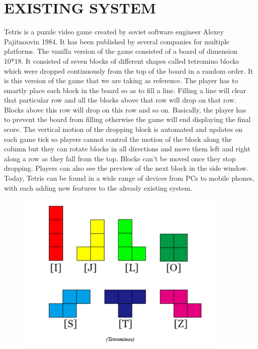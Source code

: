 \newpage
\section{EXISTING SYSTEM}
Tetris is a puzzle video game created by soviet software engineer Alexey Pajitnoovin 1984. It has been published by several companies for multiple platforms. The vanilla version of the game consisted of a board of dimension 10*18. It consisted of seven blocks of different shapes called tetromino blocks which were dropped continuously from the top of the board in a random order. It is this version of the game that we are taking as reference. The player has to smartly place each block in the board so as to fill a line. Filling a line will clear that particular row and all the blocks above that row will drop on that row. Blocks above this row will drop on this row and so on. Basically, the player has to prevent the board from filling otherwise the game will end displaying the final score. The vertical motion of the dropping block is automated and updates on each game tick so players cannot control the motion of the block along the column but they can rotate blocks in all directions and move them left and right along a row as they fall from the top. Blocks can’t be moved once they stop dropping. Players can also see the preview of the next block in the side window.
Today, Tetris can be found in a wide range of devices from PCs to mobile phones, with each adding new features to the already existing system.
\vfill
\begin{figure}[htb]
	\centering
	\includegraphics[width=0.9\textwidth]{images/Tetrominos.png}
\end{figure}
\vfill